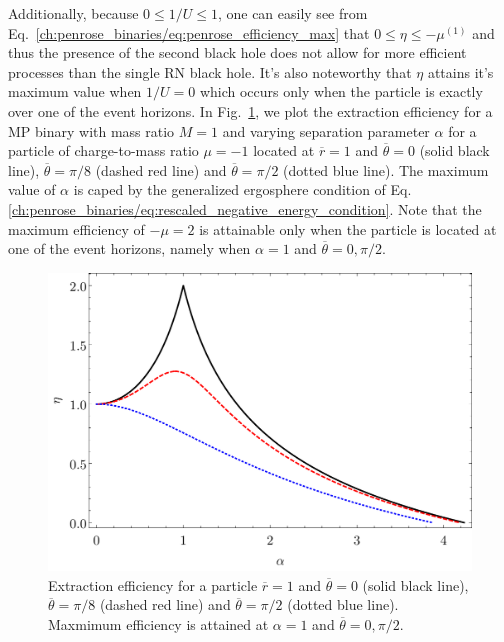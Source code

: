 Additionally, because $0 \leq 1/U \leq 1$, one can easily see from Eq.~\eqref{ch:penrose_binaries/eq:penrose_efficiency_max} that $0 \leq \eta \leq -\mu^{(1)}$ and thus the presence of the second black hole does not allow for more efficient processes than the single RN black hole. It's also noteworthy that $\eta$ attains it's maximum value when $1/U = 0$ which occurs only when the particle is exactly over one of the event horizons. In Fig.~\ref{ch:penrose_binaries/fig:efficiency}, we plot the extraction efficiency for a MP binary with mass ratio $M = 1$ and varying separation parameter $\alpha$ for a particle of charge-to-mass ratio $\mu = -1$ located at $\overline{r} = 1$ and $\overline{\theta} = 0$ (solid black line), $\overline{\theta} = \pi/8$ (dashed red line) and $\overline{\theta} = \pi/2$ (dotted blue line). The maximum value of $\alpha$ is caped by the generalized ergosphere condition of Eq.\eqref{ch:penrose_binaries/eq:rescaled_negative_energy_condition}. Note that the maximum efficiency of $-\mu = 2$ is attainable only when the particle is located at one of the event horizons, namely when $\alpha = 1$ and $\overline{\theta} = 0,\pi/2$.

\begin{figure}[!htbp]
    \centering
    \includegraphics[scale = 0.4]{img/penrose_binaries/mp/efficiency.pdf}
    \caption{Extraction efficiency for a particle $\overline{r} = 1$ and $\overline{\theta} = 0$ (solid black line), $\overline{\theta} = \pi/8$ (dashed red line) and $\overline{\theta} = \pi/2$ (dotted blue line). Maxmimum efficiency is attained at $\alpha = 1$ and $\overline{\theta} = 0,\pi/2$.}
    \label{ch:penrose_binaries/fig:efficiency}
\end{figure}